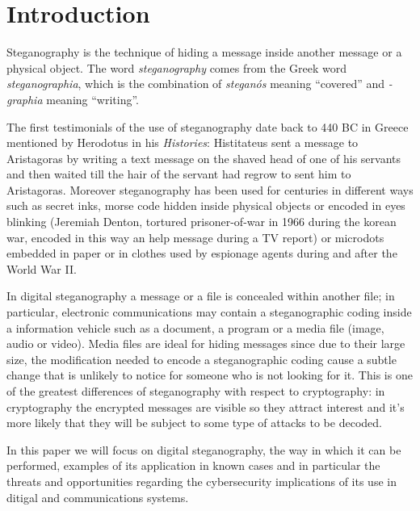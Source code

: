 \documentclass[../../main.tex]{subfiles}
\begin{document}
\section{Introduction}

Steganography is the technique of hiding a message inside another message or a physical object.
The word \textit{steganography} comes from the Greek word \textit{steganographia}, which is the combination of 
\textit{steganós} meaning ``covered'' and \textit{-graphia} meaning ``writing''.

The first testimonials of the use of steganography date back to 440 BC in Greece mentioned by Herodotus in his
\emph{Histories}: Histitateus sent a message to Aristagoras by writing a text message on the shaved head of one of his
servants and then waited till the hair of the servant had regrow to sent him to Aristagoras.
Moreover steganography has been used for centuries in different ways such as secret inks, morse code hidden inside
physical objects or encoded in eyes blinking (Jeremiah Denton, tortured prisoner-of-war in 1966 during the korean
war, encoded in this way an help message during a TV report) or microdots embedded in paper or in clothes used by
espionage agents during and after the World War II.

In digital steganography a message or a file is concealed within another file; in particular, electronic communications
may contain a steganographic coding inside a information vehicle such as a document, a program or a media file (image,
audio or video).
Media files are ideal for hiding messages since due to their large size, the modification needed to encode a
steganographic coding cause a subtle change that is unlikely to notice for someone who is not looking for it.
This is one of the greatest differences of steganography with respect to cryptography: in cryptography the encrypted
messages are visible so they attract interest and it's more likely that they will be subject to some type of attacks to
be decoded.

In this paper we will focus on digital steganography, the way in which it can be performed, examples of its application
in known cases and in particular the threats and opportunities regarding the cybersecurity implications of its use in
ditigal and communications systems.

\pagebreak
\end{document}
